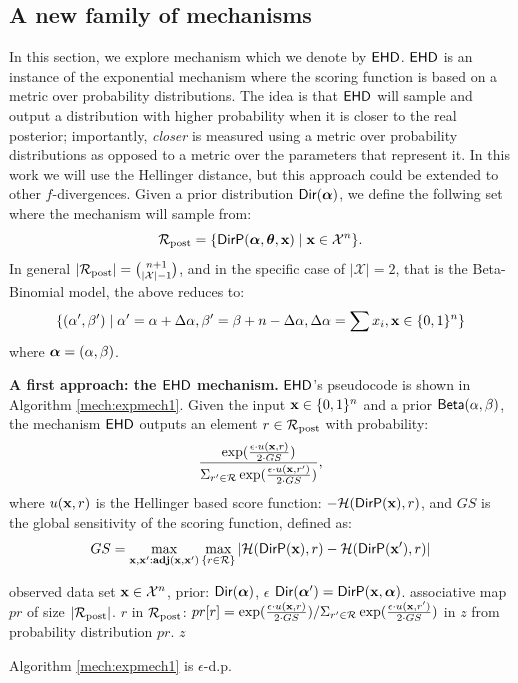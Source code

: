 \documentclass{article}
\begin{document}
\subsection{A new family of mechanisms}
\label{sec_exp}
In this section, we explore  mechanism which we denote by $\expmech$. $\expmech$ is an instance
of the exponential mechanism \cite{talwar} where the scoring function is based on a metric over
probability distributions.
The idea is that $\expmech$ will sample and output a distribution with higher probability when
it is closer to the real posterior; importantly,  \emph{closer} is measured using a metric over probability
distributions as opposed to a metric over the parameters that represent it. In this work we will
use the Hellinger distance, but this approach could be extended to other $f$-divergences. 
Given a prior distribution $\mathsf{Dir}(\boldsymbol{\alpha})$,
we define the follwing set  where the mechanism will sample from:
\[
  \mathcal{R}_{\textup{post}}=\{\mathsf{DirP}(\boldsymbol{\alpha},\boldsymbol{\theta},\textbf{x})\mid \textbf{x} \in \mathcal{X}^n\}.
\]
In general $|\mathcal{R}_{\textup{post}}|=\binom{n + 1}{|\mathcal{X}| - 1}$, and in the specific case of $|\mathcal{X}|=2$, that is the Beta-Binomial model,
the above reduces to:
\[
  \{(\alpha',\beta')\mid \alpha'=\alpha + \Delta\alpha, \beta'=\beta + n-\Delta\alpha,  \Delta\alpha=\sum x_i, \textbf{x}\in \{0,1\}^n\}
\]
where $\boldsymbol{\alpha}=(\alpha,\beta)$. 

\noindent \textbf{A first approach: the $\expmech$ mechanism.} $\expmech$'s pseudocode is shown in Algorithm \ref{mech:expmech1}.
Given the input $\textbf{x}\in\{0,1\}^n$ and a prior $\mathsf{Beta}(\alpha, \beta)$, the mechanism $\expmech$ outputs an element $r\in\mathcal{R}_{\textup{post}}$ with  probability: 
\[
\frac
  {\exp(\frac{\epsilon\cdot u(\textbf{x}, {r})}{2\cdot GS})}
{\Sigma_{r' \in \mathcal{R}}\exp(\frac{\epsilon\cdot u(\textbf{x}, {r'})}{2\cdot GS})},
\]
where $u(\textbf{x},r)$ is the Hellinger based score function:
$-\mathcal{H}(\mathsf{DirP}(\textbf{x}), r)$, and $GS$ is the global sensitivity of the scoring function, defined as:
\[
GS = 
\max_{\textbf{x},\textbf{x}': \\ \textbf{adj}(\textbf{x},\textbf{x}')}\max_{\{r\in \mathcal{R}\}}
|\mathcal{H}(\mathsf{DirP}(\textbf{x}), r) - \mathcal{H}(\mathsf{DirP}(\textbf{x}'), r)|
\]
% 
  \begin{algorithm}
  \caption{$\expmech$}
  \label{mech:expmech1}
  \begin{algorithmic}
  \INPUT observed data set $\textbf{x} \in \mathcal{X}^n$, prior: $\mathsf{Dir}(\boldsymbol{\alpha})$, $\epsilon$
  \STATE {} $\mathsf{Dir}(\boldsymbol{\alpha}')= \mathsf{DirP}(\textbf{x},\boldsymbol{\alpha})$.   
  \STATE {} associative map $pr$ of size $|\mathcal{R}_{\textup{post}}|$.
  \STATE {} $r$ in $\mathcal{R}_{\textup{post}}$:
  \STATE \quad \quad $pr[r] = 
  {\exp(\frac{\epsilon\cdot u(\textbf{x}, {r})}{2\cdot GS})}
/ {\Sigma_{r' \in \mathcal{R}}\exp(\frac{\epsilon\cdot u(\textbf{x}, r')}{2\cdot GS})}$
\STATE {} in $z$ from probability distribution $pr$.
 $z$
  \end{algorithmic}
  \end{algorithm}
\begin{lem}
  Algorithm \ref{mech:expmech1} is $\epsilon$-d.p.
\end{lem}
\end{document}
